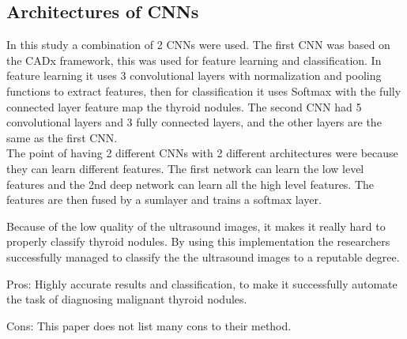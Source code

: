 \documentclass[conference]{IEEEtran}
\begin{document}
\subsection{Architectures of CNNs}
In this study a combination of 2 CNNs were used. The first CNN was based on the CADx framework, this was used for feature learning and classification. In feature learning it uses 3 convolutional layers with normalization and pooling functions to extract features, then for classification it uses Softmax with the fully connected layer feature map the thyroid nodules. The second CNN had 5 convolutional layers and 3 fully connected layers, and the other layers are the same as the first CNN.\\
The point of having 2 different CNNs with 2 different architectures were because they can learn different features. The first network can learn the low level features and the 2nd deep network can learn all the high level features. The features are then fused by a sumlayer and trains a softmax layer. 

Because of the low quality of the ultrasound images, it makes it really hard to properly classify thyroid nodules. By using this implementation the researchers successfully managed to classify the the ultrasound images to a reputable degree.

Pros: Highly accurate results and classification, to make it successfully automate the task of diagnosing malignant thyroid nodules.

Cons: This paper does not list many cons to their method. 


%
%
\end{document}

